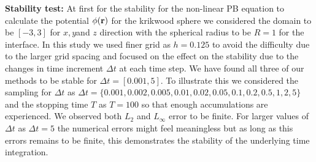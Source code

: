 \textbf{Stability test:} At first for the stability for the non-linear PB equation to calculate the potential $\phi(\bf r)$ for the krikwood sphere we considered the domain to be $[-3,3]$ for $x, y$and $z$ direction with the spherical radius to be $R = 1$ for the interface. In this study we used finer grid as $h = 0.125$ to avoid the difficulty due to the larger grid spacing and focused on the effect on the stability due to the changes in time increment $\Delta t$ at each time step. We have found all three of our methods to be stable for $\Delta t  =[0.001,5]$. To illustrate this we considered the sampling for $\Delta t $ as $\Delta t =\{0.001, 0.002, 0.005,0.01, 0.02, 0.05, 0.1, 0.2, 0.5, 1,2,5\}$ and the stopping time $T$ as $T =100$  so that enough accumulations are experienced. We observed both $L_2$ and $L_\infty$ error to be finite. For larger values of $\Delta t$ as $\Delta t =5$ the numerical errors might feel meaningless but as long as this errors remains to be finite, this demonstrates the stability of the underlying time integration. 

